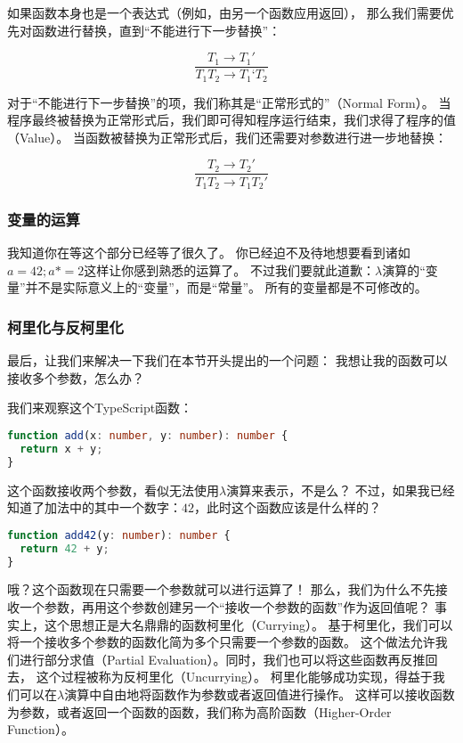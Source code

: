 \documentclass[../main.tex]{subfiles}
\begin{document}
      \indent 如果函数本身也是一个表达式（例如，由另一个函数应用返回），
      那么我们需要优先对函数进行替换，直到“不能进行下一步替换”：

      $$\frac{T_1 \to T_1'}{T_1 T_2 \to T_1‘ T_2}$$

      \indent 对于“不能进行下一步替换”的项，我们称其是“正常形式的”（Normal Form）\cite{tapl}。
      当程序最终被替换为正常形式后，我们即可得知程序运行结束，我们求得了程序的值（Value）。
      当函数被替换为正常形式后，我们还需要对参数进行进一步地替换：

      $$\frac{T_2 \to T_2'}{T_1 T_2 \to T_1 T_2'}$$
      
    \subsubsection*{变量的运算}
      \indent 我知道你在等这个部分已经等了很久了。
      你已经迫不及待地想要看到诸如$a = 42; a *= 2$这样让你感到熟悉的运算了。
      不过我们要就此道歉：$\lambda$演算的“变量”并不是实际意义上的“变量”，而是“常量”。
      所有的变量都是不可修改的。

    \subsubsection*{柯里化与反柯里化}
      \indent 最后，让我们来解决一下我们在本节开头提出的一个问题：
      我想让我的函数可以接收多个参数，怎么办？

      \indent 我们来观察这个TypeScript函数：

\begin{lstlisting}[language=TypeScript]
function add(x: number, y: number): number {
  return x + y;
}
\end{lstlisting}

      \indent 这个函数接收两个参数，看似无法使用$\lambda$演算来表示，不是么？
      不过，如果我已经知道了加法中的其中一个数字：$42$，此时这个函数应该是什么样的？

\begin{lstlisting}[language=TypeScript]
function add42(y: number): number {
  return 42 + y;
}
\end{lstlisting}

      \indent 哦？这个函数现在只需要一个参数就可以进行运算了！
      那么，我们为什么不先接收一个参数，再用这个参数创建另一个“接收一个参数的函数”作为返回值呢？
      事实上，这个思想正是大名鼎鼎的函数柯里化（Currying）。
      基于柯里化，我们可以将一个接收多个参数的函数化简为多个只需要一个参数的函数。
      这个做法允许我们进行部分求值（Partial Evaluation）。同时，我们也可以将这些函数再反推回去，
      这个过程被称为反柯里化（Uncurrying）\cite{currywiki}。
      柯里化能够成功实现，得益于我们可以在$\lambda$演算中自由地将函数作为参数或者返回值进行操作。
      这样可以接收函数为参数，或者返回一个函数的函数，我们称为高阶函数（Higher-Order Function）\cite{highwiki}。
\end{document}
